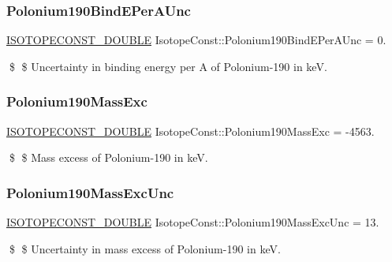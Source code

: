 \subsubsection{\texorpdfstring{Polonium190\+Bind\+E\+Per\+A\+Unc}{Polonium190BindEPerAUnc}}
{\footnotesize\ttfamily \mbox{\hyperlink{group___isotope_const-_macros_ga8f45a7272ce02c0b4c65c44636ed719a}{I\+S\+O\+T\+O\+P\+E\+C\+O\+N\+S\+T\+\_\+\+D\+O\+U\+B\+LE}} Isotope\+Const\+::\+Polonium190\+Bind\+E\+Per\+A\+Unc = 0.}

\$ \$ Uncertainty in binding energy per A of Polonium-\/190 in keV. \mbox{\label{group___isotope_const-_polonium-_po190_gab64edd4764fab43defd27efb137454d7}} 
\subsubsection{\texorpdfstring{Polonium190\+Mass\+Exc}{Polonium190MassExc}}
{\footnotesize\ttfamily \mbox{\hyperlink{group___isotope_const-_macros_ga8f45a7272ce02c0b4c65c44636ed719a}{I\+S\+O\+T\+O\+P\+E\+C\+O\+N\+S\+T\+\_\+\+D\+O\+U\+B\+LE}} Isotope\+Const\+::\+Polonium190\+Mass\+Exc = -\/4563.}

\$ \$ Mass excess of Polonium-\/190 in keV. \mbox{\label{group___isotope_const-_polonium-_po190_ga86e3844502504217c124654b21af5ef5}} 
\subsubsection{\texorpdfstring{Polonium190\+Mass\+Exc\+Unc}{Polonium190MassExcUnc}}
{\footnotesize\ttfamily \mbox{\hyperlink{group___isotope_const-_macros_ga8f45a7272ce02c0b4c65c44636ed719a}{I\+S\+O\+T\+O\+P\+E\+C\+O\+N\+S\+T\+\_\+\+D\+O\+U\+B\+LE}} Isotope\+Const\+::\+Polonium190\+Mass\+Exc\+Unc = 13.}

\$ \$ Uncertainty in mass excess of Polonium-\/190 in keV. \mbox{\label{group___isotope_const-_polonium-_po190_gabccb893231399b4a494dece59b0e1787}} 
